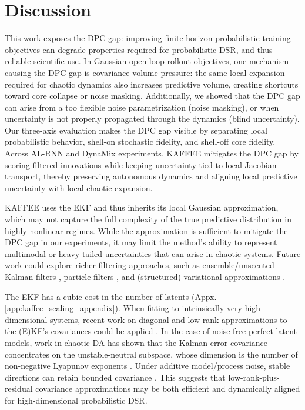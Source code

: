 \documentclass{article}
\theoremstyle{plain}
\theoremstyle{definition}
\theoremstyle{remark}
\begin{document}
\section{Discussion}
\label{sec:discussion}
This work exposes the DPC gap: improving finite-horizon probabilistic training objectives can degrade properties required for probabilistic DSR, and thus reliable scientific use.
In Gaussian open-loop rollout objectives, one mechanism causing the DPC gap is covariance-volume pressure: the same local expansion required for chaotic dynamics also increases
predictive volume, creating shortcuts toward core collapse or noise masking. Additionally, we showed that the DPC gap can arise from a too flexible noise parametrization (noise masking), or when uncertainty is not properly propagated through the dynamics (blind uncertainty). Our three-axis evaluation makes the DPC gap visible by separating local probabilistic behavior, shell-on stochastic fidelity, and shell-off core fidelity. Across AL-RNN and DynaMix experiments, KAFFEE mitigates the DPC gap by scoring
filtered innovations while keeping uncertainty tied to local Jacobian transport,
thereby preserving autonomous dynamics and aligning local predictive uncertainty
with local chaotic expansion.

KAFFEE uses the EKF and thus inherits its local Gaussian approximation, which may not capture the full complexity of the true predictive distribution in highly nonlinear regimes. While the approximation is sufficient to mitigate the DPC gap in our experiments, it may limit the method's ability to represent multimodal or heavy-tailed uncertainties that can arise in chaotic systems. Future work could explore richer filtering approaches, such as ensemble/unscented Kalman filters \citep{wan2000unscented,evensen2003ensemble}, particle filters \citep{doucet2000rao}, and (structured) variational approximations \citep{zhao2023revisiting, zhao2020variational,pals2024inferring,dowling2024exponential, brenner2024integrating}.

The EKF has a cubic cost in the number of latents (Appx. \ref{app:kaffee_scaling_appendix}). When fitting to intrinsically very high-dimensional systems, recent work on diagonal and low-rank approximations to the (E)KF's covariances could be applied \cite{chang2022diagonal,chang2023lowrank,schmidt2023rankreduced}. In the case of noise-free perfect latent models, work in chaotic DA has shown that the Kalman error covariance concentrates on the unstable-neutral subspace, whose dimension is the number of non-negative Lyapunov exponents \citep{trevisan2011kalman,carrassi2022data}. Under additive model/process noise, stable directions can retain bounded covariance \citep{grudzien2018chaotic}. This suggests that low-rank-plus-residual covariance approximations may be both efficient and dynamically aligned for high-dimensional probabilistic DSR.
\end{document}
